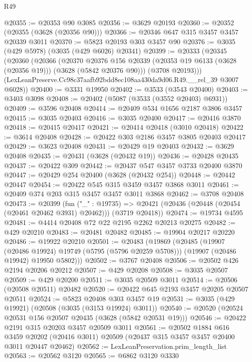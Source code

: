 \begin{lexlean}{R49}
\begin{coremodule}
@20355 := @20353 @90 @3085
@20356 := @3629 @20193
@20360 := @20352 (@20355 (@3628 (@20356 @90)))
@20366 := @20346 @647 @315 @3457 @3457 @20339 @3011
@20370 := @5823 @20193 @303 @3457 @90
@20376 := @3035 (@429 @5978) (@3035 (@429 @6026) @20341)
@20399 := @20333
    (@20345
      (@20360
        (@20366
          (@20370
            @20376
            @156
            @20339
            (@20353 @19 @6133 (@3628 (@20356 @19)))
            (@3628 (@5842 @20376 @90)))
          (@3708 @20193)))
      (LexLeanPreserve.Cc98c37aafb92bdd8ec108aa430da9d06.R49.__rel_39 @3007 @6028))
@20400 := @3331 @19950
@20402 := @3533 (@3543 @20400)
@20403 := @3403 @3098
@20408 := @20402 (@5087 (@3533 (@3552 @20403) @6931))
@20409 := @3596 @20408
@20414 := @20409 @534 @1656 @2187 @3806 @3457
@20415 := @3035 @20403
@20416 := @3035 @20400
@20417 := @20416 @3870
@20418 := @20415 @20417
@20421 := @20414 @20418 (@3010 @20418)
@20422 := @3614 @20408
@20428 := @20422 @303 @2186 @3457 @3805 @20403 @20417
@20429 := @3623 @20408
@20431 := @20429 @19 @20403
@20432 := @3629 @20408
@20435 := @20431 (@3628 (@20432 @19))
@20436 := @20428 @20435
@20437 := @20422 @309
@20442 := @20437 @547 @3457 @3733 @20400 @3870
@20447 := @20429 @254 @20400 (@3628 (@20432 @254))
@20448 := @20442 @20447
@20454 := @20422 @545 @315 @3459 @3457 @3868 @3011
@20461 := @20409 @374 @203 @315 @3457 @3457 @3011 @3868
@20462 := @3708 @20408
@20473 := @20399
    (fun ("_" : @19735) =>
    @20421 (@20436 (@20448 (@20454 (@20461 @20462 @3931) @20462))) (@3719 @20418))
@20474 := @19734 @4595
@20481 := @4414 @20408 @72 @22 @2195 @2262 @20213 @20275
@20482 := @429 @20210
@20483 := @20481 @20482
@20485 := @19904 @20217 @20220
@20486 := @19922 @20210
@20501 := @20483
    (@19869
      (@20485
        (@19907 (@20486 @19924) @19749 (@5795 (@5796 @20259 @5708)))
        (@19907 (@20486 @19942) @19950 @5802)))
@20502 := @3767 @20408
@20506 := @20502 @426 @2194 @20206 @20212
@20507 := @429 @20208
@20508 := @3035 @20507
@20509 := @429 @20200
@20511 := @3035 @20509 @3011
@20514 := @20506 (@20508 @20511) @20482
@20520 := @20422 @645 @2193 @3457 @20205 @20507 @20511
@20524 := @5823 @20408 @303 @3457 @19
@20531 := @3035 (@429 @19921) (@20508 (@3035 (@3153 @19924) @3011))
@20540 := @20520 (@20524 @20531 @156 @20507 @20435 (@3628 (@5842 @20531 @19)))
@20546 := @20422 @2191 @315 @20203 @3457 @20509 @3011
@20561 := @20502
    @1884
    @616
    @3459
    @20202
    (@20416 @3011)
    @20509
    (@20437 @315 @3457 @3457 @20400 @3011 @20447 @20462)
@20562 := LexLeanPreservation.prim_length_list
@20563 := @20562 @3120
@20565 := @6862 @3120 @3330

\end{coremodule}
\end{lexlean}
